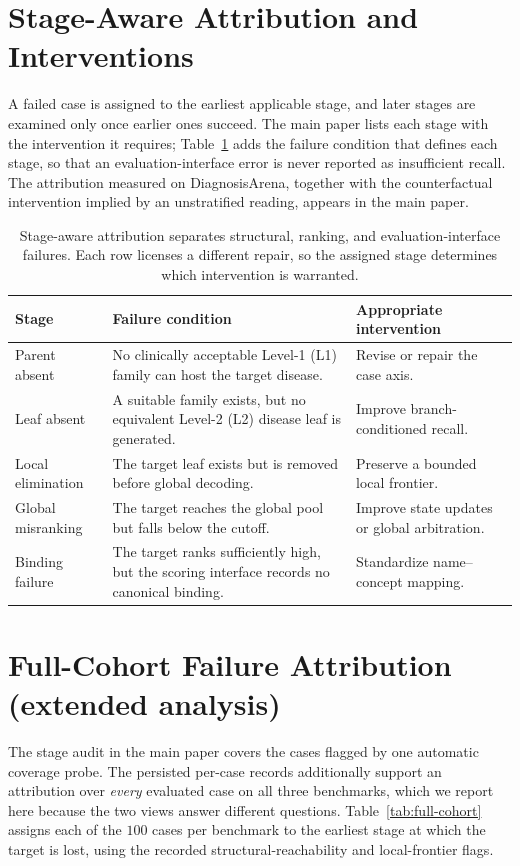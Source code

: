 \documentclass[letterpaper]{article}
\begin{document}
\section{Stage-Aware Attribution and Interventions}

A failed case is assigned to the earliest applicable stage, and later stages are examined only once earlier ones succeed.
The main paper lists each stage with the intervention it requires; Table~\ref{tab:stages} adds the failure condition that defines each stage, so that an evaluation-interface error is never reported as insufficient recall.
The attribution measured on DiagnosisArena, together with the counterfactual intervention implied by an unstratified reading, appears in the main paper.

\begin{table}[t]
\centering
\small
\begin{tabular}{lp{7.4cm}p{4.3cm}}
\toprule
Stage & Failure condition & Appropriate intervention \\
\midrule
Parent absent & No clinically acceptable Level-1 (L1) family can host the target disease. & Revise or repair the case axis. \\
Leaf absent & A suitable family exists, but no equivalent Level-2 (L2) disease leaf is generated. & Improve branch-conditioned recall. \\
Local elimination & The target leaf exists but is removed before global decoding. & Preserve a bounded local frontier. \\
Global misranking & The target reaches the global pool but falls below the cutoff. & Improve state updates or global arbitration. \\
Binding failure & The target ranks sufficiently high, but the scoring interface records no canonical binding. & Standardize name--concept mapping. \\
\bottomrule
\end{tabular}
\caption{Stage-aware attribution separates structural, ranking, and evaluation-interface failures. Each row licenses a different repair, so the assigned stage determines which intervention is warranted.}
\label{tab:stages}
\end{table}

\section{Full-Cohort Failure Attribution (extended analysis)}
\label{sec:full-cohort}

The stage audit in the main paper covers the cases flagged by one automatic coverage probe.
The persisted per-case records additionally support an attribution over \emph{every} evaluated case on all three benchmarks, which we report here because the two views answer different questions.
Table~\ref{tab:full-cohort} assigns each of the $100$ cases per benchmark to the earliest stage at which the target is lost, using the recorded structural-reachability and local-frontier flags.
\end{document}
